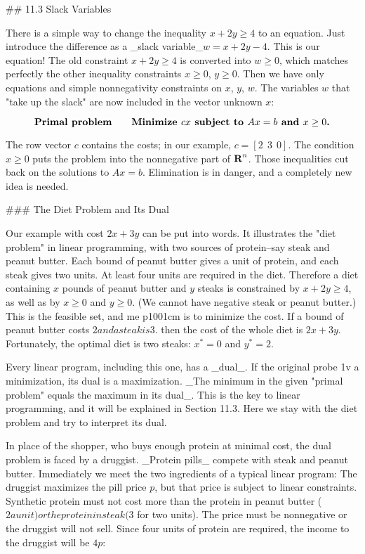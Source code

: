 

## 11.3 Slack Variables

There is a simple way to change the inequality \(x+2y\geq 4\) to an equation. Just introduce the difference as a _slack variable_\(w=x+2y-4\). This is our equation! The old constraint \(x+2y\geq 4\) is converted into \(w\geq 0\), which matches perfectly the other inequality constraints \(x\geq 0\), \(y\geq 0\). Then we have only equations and simple nonnegativity constraints on \(x\), \(y\), \(w\). The variables \(w\) that "take up the slack" are now included in the vector unknown \(x\):

\[\mbox{\bf Primal problem}\qquad\mbox{\bf Minimize $cx$ subject to $Ax=b$ and $x\geq 0$.}\]

The row vector \(c\) contains the costs; in our example, \(c=[2\ \ 3\ \ 0]\). The condition \(x\geq 0\) puts the problem into the nonnegative part of \(\mbox{\bf R}^{n}\). Those inequalities cut back on the solutions to \(Ax=b\). Elimination is in danger, and a completely new idea is needed.

### The Diet Problem and Its Dual

Our example with cost \(2x+3y\) can be put into words. It illustrates the "diet problem" in linear programming, with two sources of protein--say steak and peanut butter. Each bound of peanut butter gives a unit of protein, and each steak gives two units. At least four units are required in the diet. Therefore a diet containing \(x\) pounds of peanut butter and \(y\) steaks is constrained by \(x+2y\geq 4\), as well as by \(x\geq 0\) and \(y\geq 0\). (We cannot have negative steak or peanut butter.) This is the feasible set, and me p1001cm is to minimize the cost. If a bound of peanut butter costs $2 and a steak is $3. then the cost of the whole diet is \(2x+3y\). Fortunately, the optimal diet is two steaks: \(x^{*}=0\) and \(y^{*}=2\).

Every linear program, including this one, has a _dual_. If the original probe 1v a minimization, its dual is a maximization. _The minimum in the given "primal problem" equals the maximum in its dual_. This is the key to linear programming, and it will be explained in Section 11.3. Here we stay with the diet problem and try to interpret its dual.

In place of the shopper, who buys enough protein at minimal cost, the dual problem is faced by a druggist. _Protein pills_ compete with steak and peanut butter. Immediately we meet the two ingredients of a typical linear program: The druggist maximizes the pill price \(p\), but that price is subject to linear constraints. Synthetic protein must not cost more than the protein in peanut butter ($2 a unit) or the protein in steak ($3 for two units). The price must be nonnegative or the druggist will not sell. Since four units of protein are required, the income to the druggist will be \(4p\):

